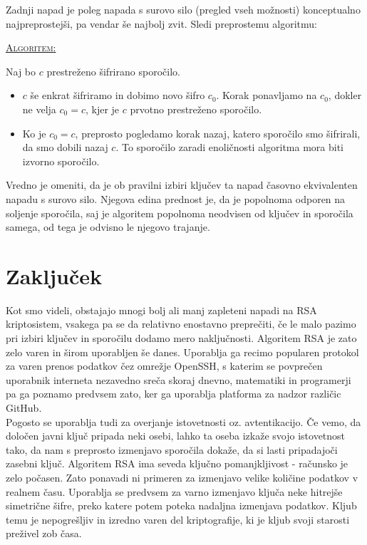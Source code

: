 \documentclass[a4paper, 12pt]{article} %
\newenvironment{matematika}[1]{
\textcolor{bostonuniversityred}{\underline{\textsc{#1:}}}
}{
}
\begin{document}
Zadnji napad je poleg napada s surovo silo (pregled vseh možnosti) konceptualno najpreprostejši, pa vendar še najbolj zvit. Sledi preprostemu algoritmu:

\begin{matematika}{Algoritem}
Naj bo $c$ prestreženo šifrirano sporočilo.
\begin{itemize}[label=]
\item $c$ še enkrat šifriramo in dobimo novo šifro $c_0$. Korak ponavljamo na $c_0$, dokler ne velja $c_0 = c$, kjer je $c$ prvotno prestreženo sporočilo.
\item Ko je $c_0 = c$, preprosto pogledamo korak nazaj, katero sporočilo smo šifrirali, da smo dobili nazaj $c$. To sporočilo zaradi enoličnosti algoritma mora biti izvorno sporočilo. \\
\end{itemize}
\end{matematika}

Vredno je omeniti, da je ob pravilni izbiri ključev ta napad časovno ekvivalenten napadu s surovo silo. Njegova edina prednost je, da je popolnoma odporen na soljenje sporočila, saj je algoritem popolnoma neodvisen od ključev in sporočila samega, od tega je odvisno le njegovo trajanje.

\newpage
\section{Zaključek}

Kot smo videli, obstajajo mnogi bolj ali manj zapleteni napadi na RSA kriptosistem, vsakega pa se da relativno enostavno preprečiti, če le malo pazimo pri izbiri ključev in sporočilu dodamo mero naključnosti. Algoritem RSA je zato zelo varen in širom uporabljen še danes. Uporablja ga recimo popularen protokol za varen prenos podatkov čez omrežje OpenSSH, s katerim se povprečen uporabnik interneta nezavedno sreča skoraj dnevno, matematiki in programerji pa ga poznamo predvsem zato, ker ga uporablja platforma za nadzor različic GitHub.\\
Pogosto se uporablja tudi za overjanje istovetnosti oz. avtentikacijo. Če vemo, da določen javni ključ pripada neki osebi, lahko ta oseba izkaže svojo istovetnost tako, da nam s preprosto izmenjavo sporočila dokaže, da si lasti pripadajoči zasebni ključ.
\newline
\newline
Algoritem RSA ima seveda ključno pomanjkljivost - računsko je zelo počasen. Zato ponavadi ni primeren za izmenjavo velike količine podatkov v realnem času. Uporablja se predvsem za varno izmenjavo ključa neke hitrejše simetrične šifre, preko katere potem poteka nadaljna izmenjava podatkov. Kljub temu je nepogrešljiv in izredno varen del kriptografije, ki je kljub svoji starosti preživel zob časa.
\end{document}

